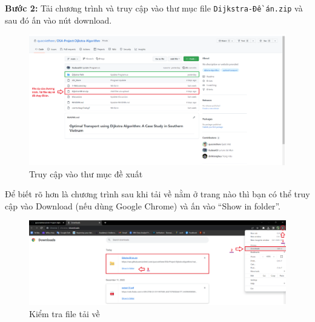 \documentclass[a4paper]{article}
\begin{document}
\textbf{Bước 2:} Tải chương trình và truy cập vào thư mục file \texttt{Dijkstra-Đề án.zip} và sau đó ấn vào nút download. 

\begin{figure}[!ht]
    \centering
    \includegraphics[width=17cm]{5.1.png}
    \caption{Truy cập vào thư mục đề xuất}
\end{figure}

Để biết rõ hơn là chương trình sau khi tải về nằm ở trang nào thì bạn có thể truy cập vào Download (nếu dùng Google Chrome) và ấn vào “Show in folder”.\\

\begin{figure}[!ht]
    \centering
    \includegraphics[width=17cm]{5.2.png}
    \caption{Kiểm tra file tải về}
\end{figure}
\end{document}
